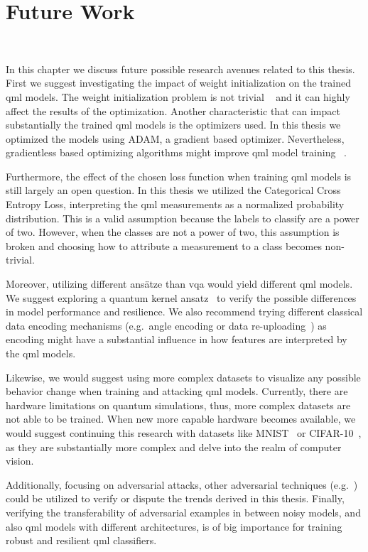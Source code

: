 \chapter{Future Work}\label{chapter:future_work} \

In this chapter we discuss future possible research avenues related to
this thesis. First we suggest investigating the impact of weight initialization
on the trained \ac{qml} models. The weight initialization problem is not trivial
~\cite{mcclean_barren_2018} and it can highly affect the results of the
optimization. Another characteristic that can impact substantially the
trained \ac{qml} models is the optimizers used. In this thesis we optimized
the models using ADAM, a gradient based optimizer. Nevertheless, gradientless
based optimizing algorithms might improve \ac{qml} model training
~\cite{kulshrestha_learning_2023}. \ 

Furthermore, the effect of the chosen loss function when training \ac{qml}
models is still largely an open question. In this thesis we utilized
the Categorical Cross Entropy Loss, interpreting the \ac{qml} measurements
as a normalized probability distribution. This is a valid assumption
because the labels to classify are a power of two. However, when the classes
are not a power of two, this assumption is broken and choosing how to
attribute a measurement to a class becomes non-trivial. \

Moreover, utilizing different ansätze than \ac{vqa} would yield
different \ac{qml} models. We suggest exploring
a quantum kernel ansatz~\cite{hubregtsen_training_2022} to
verify the possible differences in model performance and resilience.
We also recommend trying different classical data encoding mechanisms
(e.g.\ angle encoding or data re-uploading~\cite{aminpour_strategic_2024})
as encoding might have a substantial influence in how features
are interpreted by the \ac{qml} models. \

Likewise, we would suggest using more complex datasets to visualize
any possible behavior change when training and attacking \ac{qml}
models. Currently, there are hardware limitations on quantum
simulations, thus, more complex datasets are not able to be trained.
When new more capable hardware becomes available, we would suggest
continuing this research with datasets like MNIST~\cite{bottou_comparison_1994}
or CIFAR-10~\cite{krizhevsky_learning_nodate}, as they are substantially more complex and delve
into the realm of computer vision. \

Additionally, focusing on adversarial attacks, other adversarial
techniques (e.g.~\cite{carlini_towards_2017}) could be utilized
to verify or dispute the trends derived in this thesis. Finally,
verifying the transferability of adversarial examples in between noisy
models, and also \ac{qml} models with different architectures, is of big importance
for training robust and resilient \ac{qml} classifiers. \

